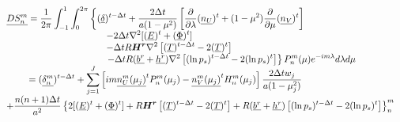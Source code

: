 \documentclass[12pt,a4paper]{book}
\begin{document}
	\begin{equation}
	\begin{array}{l}
	\displaystyle 
	\underline{DS_n^m} =  \frac{1}{2\pi} \int_{-1}^{1} \int_{0}^{2 \pi} \left\lbrace 
		(\underline{\delta})^{t-\Delta t} 
		+ \frac{2\Delta t }{a(1-\mu^2)} \left[ \frac{\partial}{\partial \lambda} (\underline{n_U})^t 
		+ (1-\mu^2) \frac{\partial}{\partial \mu} (\underline{n_V})^t \right]  \right. \\
		\displaystyle 
		\hspace{9 pc} - 2\Delta t \nabla^2 [ (\underline{E})^t +  (\underline{\Phi})^t] \\
		\displaystyle 
		\hspace{9 pc} - \Delta t R \boldsymbol{H^r} \nabla^2 \left[(\underline{T})^{t-\Delta t}  - 2(\underline{T})^t \right] \\
		\displaystyle \left. 
		\hspace{9 pc} - \Delta t R (\underline{b^r} + \underline{h^r}) \nabla^2 \left[ (\ln p_s)^{t-\Delta t} - 2(\ln p_s)^t \right]

	\right \rbrace P_n^m(\mu) e^{-im\lambda} d\lambda d\mu \\
	\displaystyle 
	\hspace{2 pc} = (\underline{\delta_n^m})^{t-\Delta t}  + \sum_{j=1}^{J} \left[ 
		 im \underline{n_U^m(\mu_j)}^t P_n^m(\mu_j) 
		-   \underline{n_V^m(\mu_j)}^t H_n^m(\mu_j) 
		\right]	\frac{2 \Delta t w_j}{a(1-\mu_j^2)}  \\
	\displaystyle 
    + \frac{n(n+1) \Delta t}{a^2} \left\lbrace 2 [(\underline{E})^t 
	+  (\underline{\Phi})^t] 
    + R \boldsymbol{H^r}  \left[ (\underline{T})^{t-\Delta t}  - 2(\underline{T})^t \right] 
	+  R (\underline{b^r} + \underline{h^r}) \left[ (\ln p_s)^{t-\Delta t} - 2 (\ln p_s)^t \right]
	 \right\rbrace _n^m	
	\end{array} 
	\end{equation}
\end{document}

